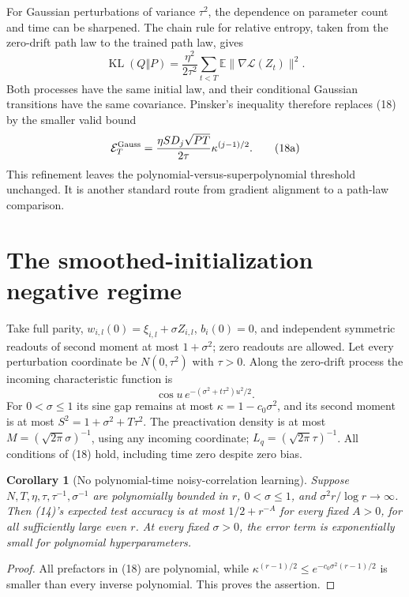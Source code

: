 \documentclass[11pt]{article}
\newtheorem{corollary}[theorem]{Corollary}
\newcommand{\E}{\mathbb E}\newcommand{\R}{\mathbb R}
\begin{document}
For Gaussian perturbations of variance $\tau^2$, the dependence on
parameter count and time can be sharpened. The chain rule for relative
entropy, taken from the zero-drift path law to the trained path law,
gives
\[
 \operatorname{KL}(Q\Vert P)
 =\frac{\eta^2}{2\tau^2}\sum_{t<T}
                  \E\|\nabla\mathcal L(Z_t)\|^2.
\]
Both processes have the same initial law, and their conditional Gaussian
transitions have the same covariance. Pinsker's inequality therefore
replaces (18) by the smaller valid bound
\[
 \mathcal E_T^{\rm Gauss}
 =\frac{\eta S D_j\sqrt{PT}}{2\tau}
                                  \kappa^{(j-1)/2}.     \tag{18a}
\]
This refinement leaves the polynomial-versus-superpolynomial threshold
unchanged. It is another standard route from gradient alignment to a
path-law comparison.

\section{The smoothed-initialization negative regime}
Take full parity, $w_{i,l}(0)=\xi_{i,l}+\sigma Z_{i,l}$,
$b_i(0)=0$, and independent symmetric readouts of second moment at
most $1+\sigma^2$; zero readouts are allowed.
Let every perturbation coordinate be $N(0,\tau^2)$ with $\tau>0$.
Along the zero-drift process the incoming characteristic function is
\[
              \cos u\,e^{-(\sigma^2+t\tau^2)u^2/2}.
\]
For $0<\sigma\le1$ its sine gap remains at most
$\kappa=1-c_0\sigma^2$, and its second moment is at most
$S^2=1+\sigma^2+T\tau^2$.
The preactivation density is at most
$M=(\sqrt{2\pi}\sigma)^{-1}$, using any incoming coordinate;
$L_q=(\sqrt{2\pi}\tau)^{-1}$.
All conditions of (18) hold, including time zero despite zero bias.

\begin{corollary}[No polynomial-time noisy-correlation learning]
Suppose $N,T,\eta,\tau,\tau^{-1},\sigma^{-1}$ are polynomially
bounded in $r$, $0<\sigma\le1$, and
$\sigma^2r/\log r\to\infty$. Then (14)'s expected test accuracy
is at most $1/2+r^{-A}$ for every fixed $A>0$, for all sufficiently
large even $r$. At every fixed $\sigma>0$, the error term is
exponentially small for polynomial hyperparameters.
\end{corollary}
\begin{proof}
All prefactors in (18) are polynomial, while
$\kappa^{(r-1)/2}\le e^{-c_0\sigma^2(r-1)/2}$ is smaller than
every inverse polynomial. This proves the assertion.
\end{proof}
\end{document}
